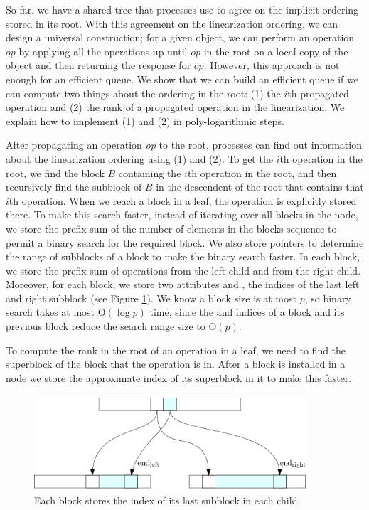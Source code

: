 So far, we have a shared tree that processes use to agree on the
implicit ordering stored in its root. With this agreement on the
linearization ordering, we can design a universal construction; for a
given object, we can perform an operation $op$ by applying all the
operations up until $op$ in the root on a local copy of the object and
then returning the response for $op$. However, this approach is not
enough for an efficient queue. 
We show that we can build an efficient queue if we can compute two
things about the ordering in the root: (1) the $i$th propagated
operation and (2) the rank of a propagated operation in the
linearization. We explain how to implement (1) and (2) in
poly-logarithmic steps. 

After propagating an operation \textit{op} to the root, processes can
find out information about the linearization ordering using (1) and
(2).  
To get the $i$th operation in the root, we find the block $B$
containing the $i$th operation in the root, and then recursively find
the subblock of $B$ in the descendent of the root that contains that
$i$th operation. When we reach a block in a leaf, the operation is
explicitly stored there. To make this search faster, instead of
iterating over all blocks in the node, we store the prefix sum of the
number of elements in the blocks sequence to permit a binary search
for the required block. We also store pointers to determine the range
of subblocks of a block to make the binary search faster. In each
block, we store the prefix sum of operations from the left child and
from the right child. Moreover, for each block, we store two
attributes  and , the indices of
the last left and right subblock (see Figure \ref{fig::pointer}). We
know a block size is at most $p$, so binary search takes at most
\textsc{O}$(\log p)$ time, since the  and
 indices of a block and its previous block reduce
the search range size to \textsc{O}$(p)$. 

To compute the rank in the root of an operation in a leaf, we need to
find the superblock of the block that the operation is in. After a
block is installed in a node we store the approximate index of its
superblock in it to make this faster. 

\begin{figure}[hbtp]
\centering
  \includegraphics[width=4in, height=1.4in]{pics/pointers}
  \caption{Each block stores the index of its last subblock in each
    child. \label{fig::pointer}} 
\end{figure}

